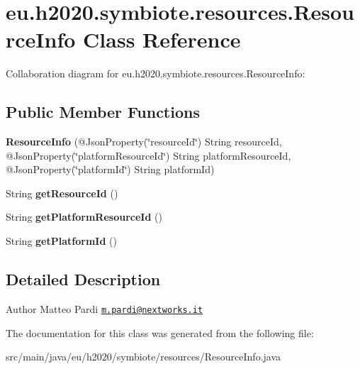 \hypertarget{classeu_1_1h2020_1_1symbiote_1_1resources_1_1ResourceInfo}{}\section{eu.\+h2020.\+symbiote.\+resources.\+Resource\+Info Class Reference}
\label{classeu_1_1h2020_1_1symbiote_1_1resources_1_1ResourceInfo}


Collaboration diagram for eu.\+h2020.\+symbiote.\+resources.\+Resource\+Info\+:
\subsection*{Public Member Functions}
\begin{DoxyCompactItemize}
\item 
\mbox{\label{classeu_1_1h2020_1_1symbiote_1_1resources_1_1ResourceInfo_a2d58652393564777b01012f1be324ca2}} 
{\bfseries Resource\+Info} (@Json\+Property(\char`\"{}resource\+Id\char`\"{}) String resource\+Id, @Json\+Property(\char`\"{}platform\+Resource\+Id\char`\"{}) String platform\+Resource\+Id, @Json\+Property(\char`\"{}platform\+Id\char`\"{}) String platform\+Id)
\item 
\mbox{\label{classeu_1_1h2020_1_1symbiote_1_1resources_1_1ResourceInfo_a872b039f78e403ef0c447e5708164597}} 
String {\bfseries get\+Resource\+Id} ()
\item 
\mbox{\label{classeu_1_1h2020_1_1symbiote_1_1resources_1_1ResourceInfo_a22bd22c0b0e3d948efc1c9b6fd3e6325}} 
String {\bfseries get\+Platform\+Resource\+Id} ()
\item 
\mbox{\label{classeu_1_1h2020_1_1symbiote_1_1resources_1_1ResourceInfo_ae7dfb0d6f2c6da73f76fdba42e75aaf6}} 
String {\bfseries get\+Platform\+Id} ()
\end{DoxyCompactItemize}


\subsection{Detailed Description}
\begin{DoxyAuthor}{Author}
Matteo Pardi \href{mailto:m.pardi@nextworks.it}{\tt m.\+pardi@nextworks.\+it} 
\end{DoxyAuthor}


The documentation for this class was generated from the following file\+:\begin{DoxyCompactItemize}
\item 
src/main/java/eu/h2020/symbiote/resources/Resource\+Info.\+java\end{DoxyCompactItemize}
